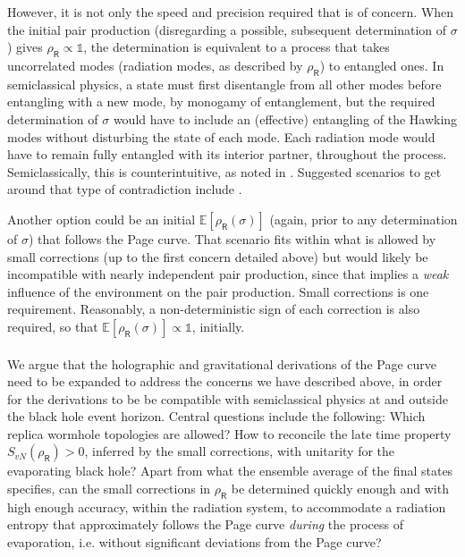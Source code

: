 \documentclass[11pt]{article}
\numberwithin{equation}{section}
\begin{document}
However, it is not only the speed and precision required that is of concern. When the initial pair production (disregarding a possible, subsequent determination of $\sigma$) gives $\rho_\textsf{R}\propto\mathbb{1}$, the determination is equivalent to a process that takes uncorrelated modes (radiation modes, as described by $\rho_\textsf{R}$) to entangled ones. In semiclassical physics, a state must first disentangle from all other modes before entangling with a new mode, by monogamy of entanglement, but the required determination of $\sigma$ would have to include an (effective) entangling of the Hawking modes without disturbing the state of each mode. Each radiation mode would have to remain fully entangled with its interior partner, throughout the process. Semiclassically, this is counterintuitive, as noted in \cite{Karlsson:2020uga}. Suggested scenarios to get around that type of contradiction include \cite{Raju:2016vsu,Raju:2018zpn}.

Another option could be an initial $\mathbb{E}[\rho_\textsf{R}(\sigma)]$ (again, prior to any determination of $\sigma$) that follows the Page curve. That scenario fits within what is allowed by small corrections (up to the first concern detailed above) but would likely be incompatible with nearly independent pair production, since that implies a \emph{weak} influence of the environment on the pair production. Small corrections is one requirement. Reasonably, a non-deterministic sign of each correction is also required, so that $\mathbb{E}[\rho_\textsf{R}(\sigma)]\propto\mathbb{1}$, initially.
\\\\
We argue that the holographic and gravitational derivations of the Page curve need to be expanded to address the concerns we have described above, in order for the derivations to be be compatible with semiclassical physics at and outside the black hole event horizon. Central questions include the following: Which replica wormhole topologies are allowed? How to reconcile the late time property $S_{vN}(\rho_\textsf{R})>0$, inferred by the small corrections, with unitarity for the evaporating black hole? Apart from what the ensemble average of the final states specifies, can the small corrections in $\rho_\textsf{R}$ be determined quickly enough and with high enough accuracy, within the radiation system, to accommodate a radiation entropy that approximately follows the Page curve \emph{during} the process of evaporation, i.e. without significant deviations from the Page curve?
\end{document}

